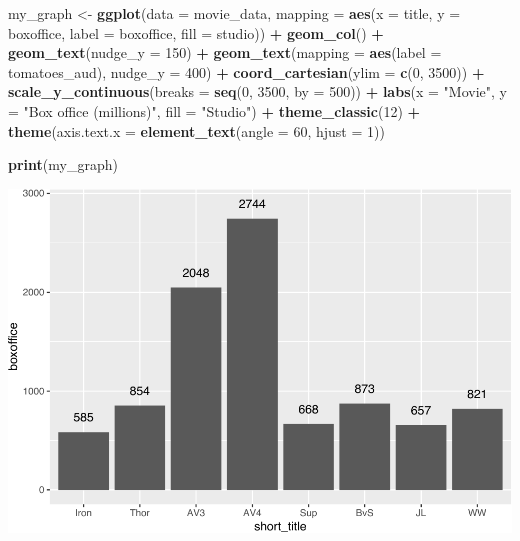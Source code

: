 \documentclass[
]{krantz}
\makeatletter
\newenvironment{Shaded}{\begin{snugshade}}{\end{snugshade}}
\newcommand{\DataTypeTok}[1]{\textcolor[rgb]{0.27,0.27,0.27}{#1}}
\newcommand{\DecValTok}[1]{\textcolor[rgb]{0.06,0.06,0.06}{#1}}
\newcommand{\KeywordTok}[1]{\textcolor[rgb]{0.27,0.27,0.27}{\textbf{#1}}}
\newcommand{\NormalTok}[1]{#1}
\newcommand{\OperatorTok}[1]{\textcolor[rgb]{0.43,0.43,0.43}{\textbf{#1}}}
\newcommand{\StringTok}[1]{\textcolor[rgb]{0.5,0.5,0.5}{#1}}
\newenvironment{kframe}{%
\medskip{}
\setlength{\fboxsep}{.8em}
 \def\at@end@of@kframe{}%
 \ifinner\ifhmode%
  \def\at@end@of@kframe{\end{minipage}}%
  \begin{minipage}{\columnwidth}%
 \fi\fi%
 \def\FrameCommand##1{\hskip\@totalleftmargin \hskip-\fboxsep
 \colorbox{shadecolor}{##1}\hskip-\fboxsep
     \hskip-\linewidth \hskip-\@totalleftmargin \hskip\columnwidth}%
 \MakeFramed {\advance\hsize-\width
   \@totalleftmargin\z@ \linewidth\hsize
   \@setminipage}}%
 {\par\unskip\endMakeFramed%
 \at@end@of@kframe}
\renewenvironment{Shaded}{\begin{kframe}}{\end{kframe}}
\makeatother
\begin{document}
\begin{Shaded}
\begin{Highlighting}[]
\NormalTok{my_graph <-}\StringTok{ }\KeywordTok{ggplot}\NormalTok{(}\DataTypeTok{data =}\NormalTok{ movie_data,}
           \DataTypeTok{mapping =} \KeywordTok{aes}\NormalTok{(}\DataTypeTok{x =}\NormalTok{ title,}
                         \DataTypeTok{y =}\NormalTok{ boxoffice,}
                         \DataTypeTok{label =}\NormalTok{ boxoffice, }
                         \DataTypeTok{fill =}\NormalTok{ studio)) }\OperatorTok{+}
\StringTok{  }\KeywordTok{geom_col}\NormalTok{() }\OperatorTok{+}
\StringTok{  }\KeywordTok{geom_text}\NormalTok{(}\DataTypeTok{nudge_y =} \DecValTok{150}\NormalTok{)  }\OperatorTok{+}
\StringTok{  }\KeywordTok{geom_text}\NormalTok{(}\DataTypeTok{mapping =} \KeywordTok{aes}\NormalTok{(}\DataTypeTok{label =}\NormalTok{ tomatoes_aud), }
            \DataTypeTok{nudge_y =} \DecValTok{400}\NormalTok{) }\OperatorTok{+}
\StringTok{  }\KeywordTok{coord_cartesian}\NormalTok{(}\DataTypeTok{ylim =} \KeywordTok{c}\NormalTok{(}\DecValTok{0}\NormalTok{, }\DecValTok{3500}\NormalTok{)) }\OperatorTok{+}
\StringTok{  }\KeywordTok{scale_y_continuous}\NormalTok{(}\DataTypeTok{breaks =} \KeywordTok{seq}\NormalTok{(}\DecValTok{0}\NormalTok{, }\DecValTok{3500}\NormalTok{, }\DataTypeTok{by =} \DecValTok{500}\NormalTok{)) }\OperatorTok{+}
\StringTok{  }\KeywordTok{labs}\NormalTok{(}\DataTypeTok{x =} \StringTok{"Movie"}\NormalTok{,}
       \DataTypeTok{y =} \StringTok{"Box office (millions)"}\NormalTok{,}
       \DataTypeTok{fill =} \StringTok{"Studio"}\NormalTok{) }\OperatorTok{+}
\StringTok{  }\KeywordTok{theme_classic}\NormalTok{(}\DecValTok{12}\NormalTok{) }\OperatorTok{+}
\StringTok{  }\KeywordTok{theme}\NormalTok{(}\DataTypeTok{axis.text.x =} \KeywordTok{element_text}\NormalTok{(}\DataTypeTok{angle =} \DecValTok{60}\NormalTok{, }
                                   \DataTypeTok{hjust =} \DecValTok{1}\NormalTok{))  }

\KeywordTok{print}\NormalTok{(my_graph)}
\end{Highlighting}
\end{Shaded}

\includegraphics{bookdown_files/figure-latex/unnamed-chunk-255-1.pdf}
\end{document}
